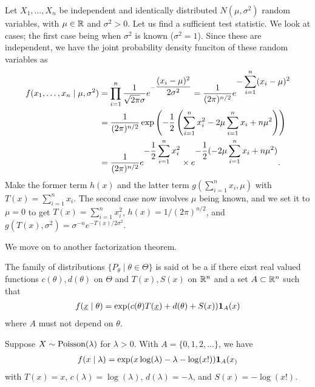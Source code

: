 \begin{example}
    Let $X_{1},\ldots,X_{n}$ be independent and identically distributed $N(\mu,\sigma^{2})$ random variables, with $\mu \in \mathbb{R}$ and $\sigma^{2} > 0$. Let us find a sufficient test statistic. We look at cases; the first case being when $\sigma^{2}$ is known ($\sigma^{2}=1$). Since these are independent, we have the joint probability density funciton of these random variables as
    \begin{align}
        f(x_{1},\ldots,x_{n} \mid \mu, \sigma^{2}) &= \prod_{i=1}^{n} \frac{1}{\sqrt{2\pi}\sigma} e^{-\dfrac{(x_{i}-\mu)^{2}}{2\sigma^{2}}} = \frac{1}{(2\pi)^{n/2}} e^{\displaystyle -\sum_{i=1}^{n} (x_{i}-\mu)^{2}} \\
        &= \frac{1}{(2\pi)^{n/2}}\exp \left(-\frac{1}{2} \left( \sum_{i=1}^{n} x_{i}^{2} - 2\mu\sum_{i=1}^{n} x_{i} + n\mu^{2} \right)  \right) \notag \\
        &= \frac{1}{(2\pi)^{n/2}} e^{\displaystyle -\frac{1}{2}\sum_{i=1}^{n} x_{i}^{2}} \times e^{\displaystyle -\frac{1}{2} (-2\mu \sum_{i=1}^{n} x_{i} + n\mu^{2})}.
    \end{align}
    Make the former term $h(x)$ and the latter term $g(\sum_{i=1}^{n} x_{i}, \mu)$ with $T(x) = \sum_{i=1}^{n} x_{i}$. The second case now involves $\mu$ being known, and we set it to $\mu = 0$ to get $T(x) = \sum_{i=1}^{n} x_{i}^{2}$, $h(x) = 1/(2\pi)^{n/2}$, and $g(T(x),\sigma^{2}) = \sigma^{-n} e^{-T(x)/2\sigma^{2}}$.
\end{example}

We move on to another factorization theorem.

\begin{definition}
    The family of distributions $\{P_{\theta} \mid \theta \in \Theta\}$ is said ot be a  if there eixst real valued functions $c(\theta),d(\theta)$ on $\Theta$ and $T(x),S(x)$ on $\mathbb{R}^{n}$ and a set $A \subset \mathbb{R}^{n}$ such that
    \begin{align}
        f(\underline{x} \mid \theta) = \exp(c(\theta)T(\underline{x}) + d(\theta) + S(x)) \textbf{1}_{A}(x)
    \end{align}
    where $A$ must not depend on $\theta$.
\end{definition}

\begin{example}
    Suppose $X \sim \operatorname{Poisson}(\lambda)$ for $\lambda > 0$. With $A = \{0,1,2,\ldots\}$, we have
    \begin{align}
        f(x \mid \lambda) = \exp(x\log(\lambda) - \lambda-\log(x!)) \textbf{1}_{A}(x_)
    \end{align}
    with $T(x) = x$, $c(\lambda) = \log(\lambda)$, $d(\lambda) = -\lambda$, and $S(x) = -\log(x!)$.
\end{example}

